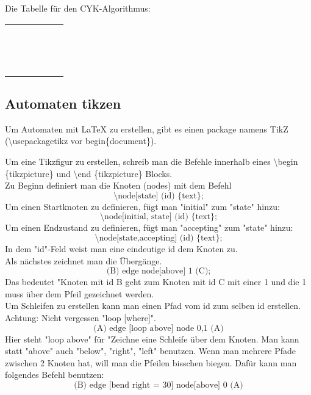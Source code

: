 \documentclass[a4paper]{scrartcl}
\begin{document}
\newpage

Die Tabelle für den CYK-Algorithmus: \\

\begin{tabular}{|p{1cm}|p{1cm}|p{1cm}|p{1cm}|p{1cm}|p{1cm}|} \cline{1-1}
 & \multicolumn{5}{c}{} \\ 
 & \multicolumn{5}{c}{} \\ \cline{1-2}
 & & \multicolumn{4}{c}{} \\ 
 & & \multicolumn{4}{c}{} \\ \cline{1-3}
 & & & \multicolumn{3}{c}{} \\ 
 & & & \multicolumn{3}{c}{} \\ \cline{1-4}
 & & & & \multicolumn{2}{c}{} \\
 & & & & \multicolumn{2}{c}{} \\ \cline{1-5}
 & & & & & \multicolumn{1}{c}{} \\
 & & & & & \multicolumn{1}{c}{} \\ \cline{1-6}
 & & & & & \\ 
  & & & & &   \\ \hline
 & & & & & \\
  & & & & &   \\ \hline
\end{tabular}


\subsection*{Automaten tikzen}

Um Automaten mit LaTeX zu erstellen, gibt es einen package namens TikZ (\textbackslash usepackage{tikz} vor begin\{document\}).

Um eine Tikzfigur zu erstellen, schreib man die Befehle innerhalb eines \textbackslash begin \{tikzpicture\} und \textbackslash end \{tikzpicture\} Blocks. \\
Zu Beginn definiert man die Knoten (nodes) mit dem Befehl \[\text{\textbackslash node[state] (id)  \{text\};}\]
Um einen Startknoten zu definieren, fügt man "initial" zum "state" hinzu:
\[\text{\textbackslash node[initial, state] (id)  \{text\};}\]
Um einen Endzustand zu definieren, fügt man "accepting" zum "state" hinzu:
\[\text{\textbackslash node[state,accepting] (id)  \{text\};}\]
In dem "id"-Feld weist man eine eindeutige id dem Knoten zu.  \\

Als nächstes zeichnet man die Übergänge. 
\[\text{(B) edge 	   	node[above] {1}	(C);}\]
Das bedeutet "Knoten mit id B geht zum Knoten mit id C mit einer 1 und die 1 muss über dem Pfeil gezeichnet werden.  \\
Um Schleifen zu erstellen kann man einen Pfad vom id zum selben id erstellen. Achtung: Nicht vergessen "loop [where]".
\[\text{(A) edge [loop above] 	node {0,1} 	(A)}\]
Hier steht "loop above" für "Zeichne eine Schleife über dem Knoten. Man kann statt "above" auch "below", "right", "left" benutzen. 
Wenn man mehrere Pfade zwischen 2 Knoten hat, will man die Pfeilen bisschen biegen. Dafür kann man folgendes Befehl benutzen:
\[\text{(B) edge [bend right = 30] 	node[above] {0} 	(A)}\]
\end{document}
